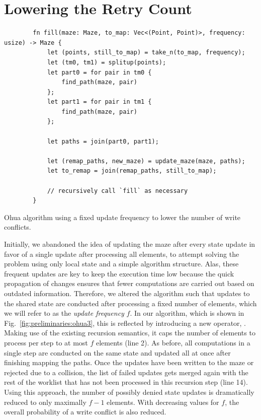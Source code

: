 \section{Lowering the Retry Count}
\label{sec:preliminaries:retries}

\begin{listing}[!b]
    \begin{verbatim}
        fn fill(maze: Maze, to_map: Vec<(Point, Point)>, frequency: usize) -> Maze {
            let (points, still_to_map) = take_n(to_map, frequency);
            let (tm0, tm1) = splitup(points);
            let part0 = for pair in tm0 {
                find_path(maze, pair)
            };
            let part1 = for pair in tm1 {
                find_path(maze, pair)
            };
        
            let paths = join(part0, part1);
        
            let (remap_paths, new_maze) = update_maze(maze, paths);
            let to_remap = join(remap_paths, still_to_map);
        
            // recursively call `fill` as necessary
        }
    \end{verbatim}
    \caption{Ohua algorithm using a fixed update frequency to lower the number of write conflicts.}%
    \label{fig:preliminaries:ohua3}
\end{listing}

Initially, we abandoned the idea of updating the maze after every state update in favor of a single update after processing all elements, to attempt solving the problem using only local state and a simple algorithm structure.
Alas, these frequent updates are key to keep the execution time low because the quick propagation of changes ensures that fewer computations are carried out based on outdated information.
Therefore, we altered the algorithm such that updates to the shared state are conducted after processing a fixed number of elements, which we will refer to as the \emph{update frequency} $f$.
In our algorithm, which is shown in Fig.~\ref{fig:preliminaries:ohua3}, this is reflected by introducing a new operator, .
Making use of the existing recursion semantics, it caps the number of elements to process per step to at most $f$ elements (line 2).
As before, all computations in a single step are conducted on the same state and updated all at once after finishing mapping the paths.
Once the updates have been written to the maze or rejected due to a collision, the list of failed updates gets merged again with the rest of the worklist that has not been processed in this recursion step (line 14).
Using this approach, the number of possibly denied state updates is dramatically reduced to only maximally $f - 1$ elements.
With decreasing values for $f$, the overall probability of a write conflict is also reduced.

